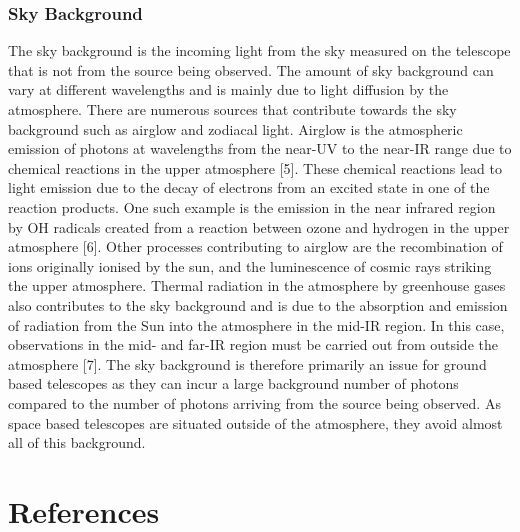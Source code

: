 \documentclass[pdf,color]{UoBnote}
\begin{document}
\subsubsection{Sky Background}
The sky background is the incoming light from the sky measured on the telescope that is not from the source being observed. The amount of sky background can vary at different wavelengths and is mainly due to light diffusion by the atmosphere. There are numerous sources that contribute towards the sky background such as airglow and zodiacal light. Airglow is the atmospheric emission of photons at wavelengths from the near-UV to the near-IR range due to chemical reactions in the upper atmosphere [5]. These chemical reactions lead to light emission due to the decay of electrons from an excited state in one of the reaction products. One such example is the emission in the near infrared region by OH radicals created from a reaction between ozone and hydrogen in the upper atmosphere [6]. Other processes contributing to airglow are the recombination of ions originally ionised by the sun, and the luminescence of cosmic rays striking the upper atmosphere. Thermal radiation in the atmosphere by greenhouse gases also contributes to the sky background and is due to the absorption and emission of radiation from the Sun into the atmosphere in the mid-IR region. In this case, observations in the mid- and far-IR region must be carried out from outside the atmosphere [7]. The sky background is therefore primarily an issue for ground based telescopes as they can incur a large background number of photons compared to the number of photons arriving from the source being observed. As space based telescopes are situated outside of the atmosphere, they avoid almost all of this background.

\section{References}
\end{document}
